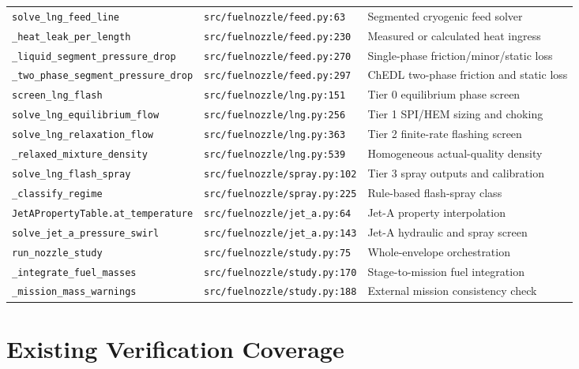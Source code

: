 \documentclass[11pt]{article}
\newcommand{\code}[1]{\nolinkurl{#1}}
\newcommand{\srcline}[2]{\nolinkurl{#1:#2}}
\begin{document}
\begin{longtable}{>{\raggedright\arraybackslash}p{}
                  >{\raggedright\arraybackslash}p{}
                  >{\raggedright\arraybackslash}p{}}
\code{solve_lng_feed_line} & \srcline{src/fuelnozzle/feed.py}{63} & Segmented cryogenic feed solver \\
\code{_heat_leak_per_length} & \srcline{src/fuelnozzle/feed.py}{230} & Measured or calculated heat ingress \\
\code{_liquid_segment_pressure_drop} & \srcline{src/fuelnozzle/feed.py}{270} & Single-phase friction/minor/static loss \\
\code{_two_phase_segment_pressure_drop} & \srcline{src/fuelnozzle/feed.py}{297} & ChEDL two-phase friction and static loss \\
\code{screen_lng_flash} & \srcline{src/fuelnozzle/lng.py}{151} & Tier 0 equilibrium phase screen \\
\code{solve_lng_equilibrium_flow} & \srcline{src/fuelnozzle/lng.py}{256} & Tier 1 SPI/HEM sizing and choking \\
\code{solve_lng_relaxation_flow} & \srcline{src/fuelnozzle/lng.py}{363} & Tier 2 finite-rate flashing screen \\
\code{_relaxed_mixture_density} & \srcline{src/fuelnozzle/lng.py}{539} & Homogeneous actual-quality density \\
\code{solve_lng_flash_spray} & \srcline{src/fuelnozzle/spray.py}{102} & Tier 3 spray outputs and calibration \\
\code{_classify_regime} & \srcline{src/fuelnozzle/spray.py}{225} & Rule-based flash-spray class \\
\code{JetAPropertyTable.at_temperature} & \srcline{src/fuelnozzle/jet_a.py}{64} & Jet-A property interpolation \\
\code{solve_jet_a_pressure_swirl} & \srcline{src/fuelnozzle/jet_a.py}{143} & Jet-A hydraulic and spray screen \\
\code{run_nozzle_study} & \srcline{src/fuelnozzle/study.py}{75} & Whole-envelope orchestration \\
\code{_integrate_fuel_masses} & \srcline{src/fuelnozzle/study.py}{170} & Stage-to-mission fuel integration \\
\code{_mission_mass_warnings} & \srcline{src/fuelnozzle/study.py}{188} & External mission consistency check \\
\bottomrule
\end{longtable}
\normalsize

\section{Existing Verification Coverage}
\end{document}
